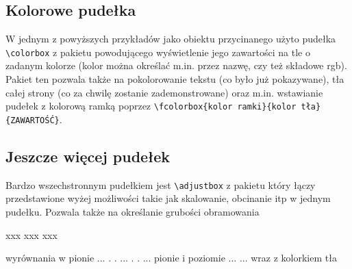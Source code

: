\documentclass[fontSize=10pt,extra]{pdfArticle}
\begin{document}
\subsection{Kolorowe pudełka}
W jednym z powyższych przykładów jako obiektu przycinanego użyto pudełka \Verb#\colorbox# z pakietu  powodującego wyświetlenie jego zawartości na tle o zadanym kolorze (kolor można określać m.in. przez nazwę, czy też składowe rgb). Pakiet ten pozwala także na pokolorowanie tekstu (co było już pokazywane), tła całej strony (co za chwilę zostanie zademonstrowane) oraz m.in. wstawianie pudełek z kolorową ramką  poprzez \Verb#\fcolorbox{kolor ramki}{kolor tła}{ZAWARTOŚĆ}#.


\subsection{Jeszcze więcej pudełek}

Bardzo wszechstronnym pudełkiem jest \Verb#\adjustbox# z pakietu  który łączy przedstawione wyżej możliwości takie jak skalowanie, obcinanie itp w jednym pudełku. Pozwala także na określanie grubości obramowania

\begin{ExampleVertical}
xxx 
xxx  xxx
\end{ExampleVertical}

\begin{ExampleVertical}
wyrównania w pionie ...
.
.
...
.
.
...
pionie i poziomie ...
... wraz z kolorkiem tła
\end{ExampleVertical}
\end{document}

